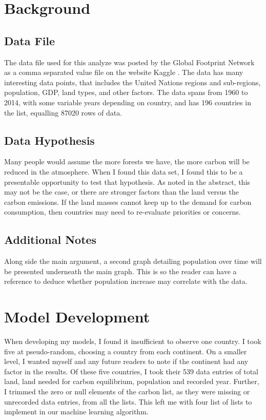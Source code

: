 \documentclass[journal,onecolumn]{IEEEtran}
\begin{document}
\section{Background}
\subsection{Data File}
The data file used for this analyze was posted by the Global Footprint Network as a comma separated value file on the website Kaggle \cite{national:2018}. The data has many interesting data points, that includes the United Nations regions and sub-regions, population, GDP, land types, and other factors. The data spans from 1960 to 2014, with some variable years depending on country, and has 196 countries in the list, equalling 87020 rows of data.
\subsection{Data Hypothesis} 
Many people would assume the more forests we have, the more carbon will be reduced in the atmosphere. When I found this data set, I found this to be a presentable opportunity to test that hypothesis. As noted in the abstract, this may not be the case, or there are stronger factors than the land versus the carbon emissions. If the land masses cannot keep up to the demand for carbon consumption, then countries may need to re-evaluate priorities or concerns.
\subsection{Additional Notes}
Along side the main argument, a second graph detailing population over time will be presented underneath the main graph. This is so the reader can have a reference to deduce whether population increase may correlate with the data. 

\newpage

\section{Model Development}
    When developing my models, I found it insufficient to observe one country. I took five at pseudo-random, choosing a country from each continent. On a smaller level, I wanted myself and any future readers to note if the continent had any factor in the results. Of these five countries, I took their 539 data entries of total land, land needed for carbon equilibrium, population and recorded year. Further, I trimmed the zero or null elements of the carbon list, as they were missing or unrecorded data entries, from all the lists. This left me with four list of lists to implement in our machine learning algorithm.
    
\end{document}
